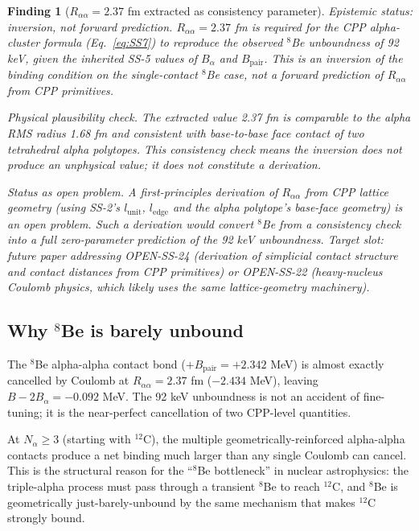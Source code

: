 \documentclass[11pt,letterpaper]{article}
\newtheorem{finding}[theorem]{Finding}
\newcommand{\Bpair}{B_{\mathrm{pair}}}
\newcommand{\Balpha}{B_{\alpha}}
\newcommand{\Nalpha}{N_{\alpha}}
\newcommand{\lunit}{l_{\mathrm{unit}}}
\newcommand{\ledge}{l_{\mathrm{edge}}}
\newcommand{\Raa}{R_{\alpha\alpha}}
\begin{document}
\begin{finding}[$\Raa = 2.37$ fm extracted as consistency parameter]
\label{find:Raa}
\emph{Epistemic status: inversion, not forward prediction.} $\Raa = 2.37$ fm is required for the CPP alpha-cluster formula (Eq.~\ref{eq:SS7}) to reproduce the observed ${}^8$Be unboundness of 92 keV, given the inherited SS-5 values of $\Balpha$ and $\Bpair$. This is an \emph{inversion} of the binding condition on the single-contact ${}^8$Be case, not a forward prediction of $\Raa$ from CPP primitives.

\emph{Physical plausibility check.} The extracted value 2.37 fm is comparable to the alpha RMS radius 1.68 fm and consistent with base-to-base face contact of two tetrahedral alpha polytopes. This consistency check means the inversion does not produce an unphysical value; it does not constitute a derivation.

\emph{Status as open problem.} A first-principles derivation of $\Raa$ from CPP lattice geometry (using SS-2's $\lunit$, $\ledge$ and the alpha polytope's base-face geometry) is an open problem. Such a derivation would convert ${}^8$Be from a consistency check into a full zero-parameter prediction of the 92 keV unboundness. Target slot: future paper addressing OPEN-SS-24 (derivation of simplicial contact structure and contact distances from CPP primitives) or OPEN-SS-22 (heavy-nucleus Coulomb physics, which likely uses the same lattice-geometry machinery).
\end{finding}

\subsection{Why ${}^8$Be is barely unbound}

The ${}^8$Be alpha-alpha contact bond ($+\Bpair = +2.342$ MeV) is almost exactly cancelled by Coulomb at $\Raa = 2.37$ fm ($-2.434$ MeV), leaving $B - 2\Balpha = -0.092$ MeV. The 92 keV unboundness is not an accident of fine-tuning; it is the near-perfect cancellation of two CPP-level quantities.

At $\Nalpha \geq 3$ (starting with ${}^{12}$C), the multiple geometrically-reinforced alpha-alpha contacts produce a net binding much larger than any single Coulomb can cancel. This is the structural reason for the ``${}^8$Be bottleneck'' in nuclear astrophysics: the triple-alpha process must pass through a transient ${}^8$Be to reach ${}^{12}$C, and ${}^8$Be is geometrically just-barely-unbound by the same mechanism that makes ${}^{12}$C strongly bound.
\end{document}
